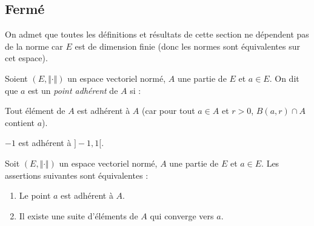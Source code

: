 \documentclass[a4paper,10pt]{report}
\begin{document}
%

\subsection{Fermé}

\begin{thm} On admet que toutes les définitions et résultats de cette section ne dépendent pas de la norme car $E$ est de dimension finie (donc les normes sont équivalentes sur cet espace).
\end{thm}


\begin{defin} 
Soient $(E, \Vert \cdot \Vert)$ un espace vectoriel normé, $A$ une partie de $E$ et $a \in E$. On dit que $a$ est un \textit{point adhérent} de $A$ si :
\vspace{1cm}
%
\end{defin}

\begin{rems} 
\item Tout élément de $A$ est adhérent à $A$ (car pour tout $a \in A$ et $r>0$, $B(a,r) \cap A$ contient $a$).
\item $-1$ est adhérent à $]-1,1[$.
\end{rems}

\begin{prop} Soit $(E, \Vert \cdot \Vert)$ un espace vectoriel normé, $A$ une partie de $E$ et $a \in E$. Les assertions suivantes sont équivalentes :

\begin{enumerate}
\item Le point $a$ est adhérent à $A$.
\item Il existe une suite d'éléments de $A$ qui converge vers $a$.
\end{enumerate}
\end{prop}
\end{document}
